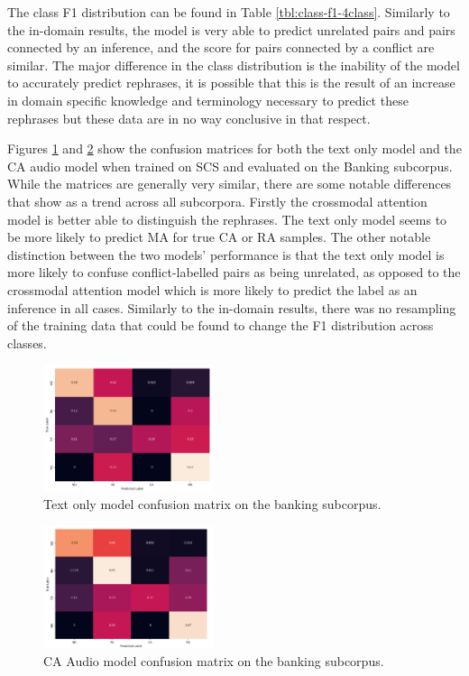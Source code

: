 \documentclass[twocolumn,twoside]{article}
\begin{document}
The class F1 distribution can be found in Table
\ref{tbl:class-f1-4class}. Similarly to the in-domain results, the model
is very able to predict unrelated pairs and pairs connected by an
inference, and the score for pairs connected by a conflict are similar.
The major difference in the class distribution is the inability of the
model to accurately predict rephrases, it is possible that this is the
result of an increase in domain specific knowledge and terminology
necessary to predict these rephrases but these data are in no way
conclusive in that respect.

Figures \ref{fig:res-cd-text-banking} and \ref{fig:res-cd-ca-banking}
show the confusion matrices for both the text only model and the CA
audio model when trained on SCS and evaluated on the Banking subcorpus.
While the matrices are generally very similar, there are some notable
differences that show as a trend across all subcorpora. Firstly the
crossmodal attention model is better able to distinguish the rephrases.
The text only model seems to be more likely to predict MA for true CA or
RA samples. The other notable distinction between the two models'
performance is that the text only model is more likely to confuse
conflict-labelled pairs as being unrelated, as opposed to the crossmodal
attention model which is more likely to predict the label as an
inference in all cases. Similarly to the in-domain results, there was no
resampling of the training data that could be found to change the F1
distribution across classes.

\begin{figure}[H]
\centering
\centering
\includegraphics[width=5cm]{text-only-conf-mat-4class-banking}
\caption{Text only model confusion matrix on the banking subcorpus.\label{fig:res-cd-text-banking}}
\end{figure}

\begin{figure}[H]
\centering
\includegraphics[width=5cm]{ca-audio-conf-mat-4class-banking}
\caption{CA Audio model confusion matrix on the banking subcorpus.\label{fig:res-cd-ca-banking}}
\end{figure}
\end{document}

